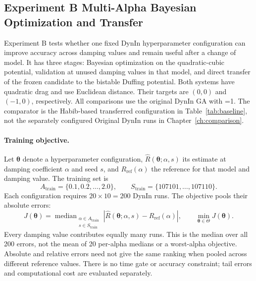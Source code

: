 \subsection{Experiment B Multi-Alpha Bayesian Optimization and Transfer}
\label{sec:b-method}

\begin{bluerevision}
Experiment B tests whether one fixed DynIn hyperparameter configuration can improve accuracy across damping values and remain useful after a change of model. It has three stages: Bayesian optimization on the quadratic-cubic potential, validation at unused damping values in that model, and direct transfer of the frozen candidate to the bistable Duffing potential. Both systems have quadratic drag and use Euclidean distance. Their targets are $(0,0)$ and $(-1,0)$, respectively. All comparisons use the original DynIn GA with =1. The comparator is the Habib-based transferred configuration in Table~\ref{tab:baseline}, not the separately configured Original DynIn runs in Chapter~\ref{ch:comparison}.

\paragraph{Training objective.}
Let $\boldsymbol\theta$ denote a hyperparameter configuration, $\hat R(\boldsymbol\theta;\alpha,s)$ its estimate at damping coefficient $\alpha$ and seed $s$, and $R_{\mathrm{ref}}(\alpha)$ the reference for that model and damping value. The training set is
\[
 A_{\mathrm{train}}=\{0.1,0.2,\ldots,2.0\},\qquad
 S_{\mathrm{train}}=\{107101,\ldots,107110\}.
\]
Each configuration requires $20\times10=200$ DynIn runs. The objective pools their absolute errors:
\begin{equation}
 J(\boldsymbol\theta)=\operatorname{median}_{\substack{\alpha\in A_{\mathrm{train}}\\s\in S_{\mathrm{train}}}}
 \left|\hat R(\boldsymbol\theta;\alpha,s)-R_{\mathrm{ref}}(\alpha)\right|,
 \qquad \min_{\boldsymbol\theta\in\Theta}J(\boldsymbol\theta).
 \label{eq:b-objective}
\end{equation}
Every damping value contributes equally many runs. This is the median over all 200 errors, not the mean of 20 per-alpha medians or a worst-alpha objective. Absolute and relative errors need not give the same ranking when pooled across different reference values. There is no time gate or accuracy constraint; tail errors and computational cost are evaluated separately.


\end{bluerevision}
